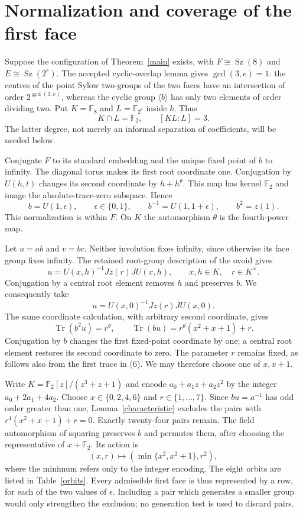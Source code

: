 \documentclass[11pt,a4paper]{article}
\newcommand{\Sz}{\operatorname{Sz}}
\newcommand{\Tr}{\operatorname{Tr}}
\newcommand{\F}{\mathbb F}
\begin{document}
\section*{Normalization and coverage of the first face}

Suppose the configuration of Theorem~\ref{main} exists, with
$F\cong\Sz(8)$ and $E\cong\Sz(2^e)$. The accepted cyclic-overlap
lemma gives $\gcd(3,e)=1$: the centres of the point Sylow two-groups
of the two faces have an intersection of order $2^{\gcd(3,e)}$,
whereas the cyclic group $\langle b\rangle$ has only two elements
of order dividing two. Put $K=\F_8$ and $L=\F_{2^e}$ inside $k$.
Thus
\[
 K\cap L=\F_2,\qquad [KL:L]=3.                       \tag{3}
\]
The latter degree, not merely an informal separation of coefficients,
will be needed below.

Conjugate $F$ to its standard embedding and the unique fixed point of
$b$ to infinity. The diagonal torus makes its first root coordinate
one. Conjugation by $U(h,t)$ changes its second coordinate by
$h+h^\theta$. This map has kernel $\F_2$ and image the
absolute-trace-zero subspace. Hence
\[
 b=U(1,\epsilon),\qquad \epsilon\in\{0,1\},\qquad
 b^{-1}=U(1,1+\epsilon),\qquad b^2=z(1).              \tag{4}
\]
This normalization is within $F$. On $K$ the automorphism $\theta$
is the fourth-power map.

Let $u=ab$ and $v=bc$. Neither involution fixes infinity, since
otherwise its face group fixes infinity. The retained root-group
description of the ovoid gives
\[
 u=U(x,h)^{-1}Jz(r)JU(x,h),\qquad x,h\in K,\quad r\in K^\times.
\]
Conjugation by a central root element removes $h$ and preserves $b$.
We consequently take
\[
 u=U(x,0)^{-1}Jz(r)JU(x,0).                          \tag{5}
\]
The same coordinate calculation, with arbitrary second coordinate,
gives
\[
 \Tr(b^2u)=r^\theta,\qquad
 \Tr(bu)=r^\theta(x^2+x+1)+r.                       \tag{6}
\]
Conjugation by $b$ changes the first fixed-point coordinate by one;
a central root element restores its second coordinate to zero.
The parameter $r$ remains fixed, as follows also from the first
trace in (6). We may therefore choose one of $x,x+1$.

Write $K=\F_2[z]/(z^3+z+1)$ and encode
$a_0+a_1z+a_2z^2$ by the integer $a_0+2a_1+4a_2$.
Choose $x\in\{0,2,4,6\}$ and $r\in\{1,\ldots,7\}$.
Since $bu=a^{-1}$ has odd order greater than one,
Lemma~\ref{characteristic} excludes the pairs with
$r^4(x^2+x+1)+r=0$. Exactly twenty-four pairs remain.
The field automorphism of squaring preserves $b$ and permutes them,
after choosing the representative of $x+\F_2$. Its action is
\[
 (x,r)\longmapsto (\min\{x^2,x^2+1\},r^2),           \tag{7}
\]
where the minimum refers only to the integer encoding.
The eight orbits are listed in Table~\ref{orbits}. Every admissible
first face is thus represented by a row, for each of the two values
of $\epsilon$. Including a pair which generates a smaller group
would only strengthen the exclusion; no generation test is used
to discard pairs.
\end{document}
